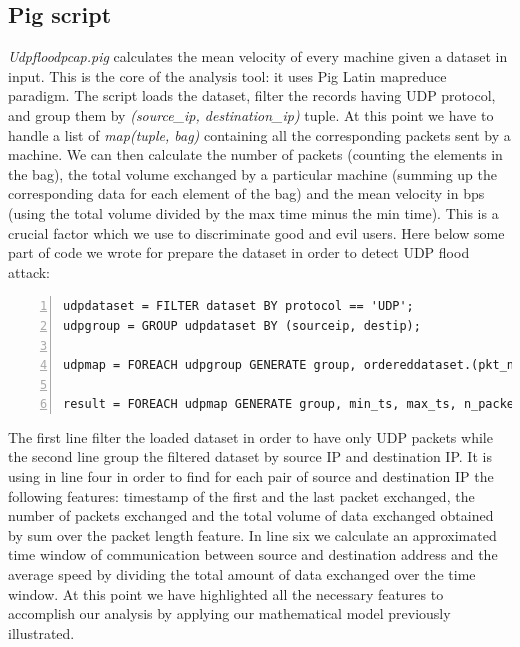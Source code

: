 \subsection{Pig script}
\textit{Udpfloodpcap.pig} calculates the mean velocity of every machine given a dataset in input. 
This is the core of the analysis tool: it uses Pig Latin mapreduce paradigm. 
The script loads the dataset, filter the records having UDP protocol, and group them by \textit{(source\_ip, destination\_ip)} tuple. 
At this point we have to handle a list of \textit{map(tuple, bag)} containing all the corresponding packets sent by a machine. 
We can then calculate the number of packets (counting the elements in the bag), the total volume exchanged by a particular machine (summing up the corresponding data for each element of the bag) and the mean velocity in bps (using the total volume divided by the max time minus the min time). 
This is a crucial factor which we use to discriminate good and evil users. Here below some part of code we wrote for prepare the dataset in order to detect UDP flood attack:


\begin{lstlisting}[numbers=left, columns=flexible, breaklines=true, frame=tb, caption={\textit{Udpfloodpcap.pig} script}, label={lst:udpfloodscript}]
udpdataset = FILTER dataset BY protocol == 'UDP';
udpgroup = GROUP udpdataset BY (sourceip, destip);

udpmap = FOREACH udpgroup GENERATE group, ordereddataset.(pkt_n,time,dim), MIN(ordereddataset.time) AS min_ts, MAX(ordereddataset.time) AS max_ts, COUNT(ordereddataset.pkt_n) AS n_packets, SUM(ordereddataset.dim) AS total_volume;

result = FOREACH udpmap GENERATE group, min_ts, max_ts, n_packets,total_volume, (float)(max_ts-min_ts) AS time_difference, (float)(total_volume/(max_ts-min_ts)) AS ratio_vol_td;

\end{lstlisting}

The first line filter the loaded dataset in order to have only UDP packets while the second line group the filtered dataset by source IP and destination IP. 
It is using in line four in order to find for each pair of source and destination IP the following features: timestamp of the first and the last packet exchanged, the number of packets exchanged and the total volume of data exchanged obtained by sum over the packet length feature. 
In line six we calculate an approximated time window of communication between source and destination address and the average speed by dividing the total amount of data exchanged over the time window.
At this point we have highlighted all the necessary features to accomplish our analysis by applying our mathematical model previously illustrated.










   

